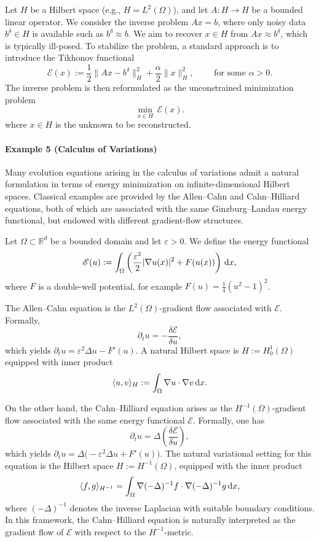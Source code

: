 \documentclass[12pt]{amsart}
\newcommand{\D}[1]{\mbox{\rm #1}}
\newcommand{\dd}{\D{d}}
\numberwithin{equation}{section}
\begin{document}
Let $H$ be a Hilbert space (e.g.,  $H = L^2(\Omega)$), and let $A : H \to H$ be a bounded linear operator. We consider the inverse problem $Ax = b$, where only noisy data $b^\delta \in H$ is available such as $b^\delta \approx b$. We aim to recover $x \in H$ from $Ax \approx b^\delta$, which is typically ill-posed. 
To stabilize the problem, a standard approach is to introduce the Tikhonov functional
\[
    \mathscr{E}(x) := \frac{1}{2}\|Ax - b^\delta\|_H^2 + \frac{\alpha}{2}\|x\|_H^2, \qquad \text{ for some } \alpha > 0.
\]
The inverse problem is then reformulated as the unconstrained minimization problem
\[
    \min_{x \in H}\, \mathscr{E}(x).
\]
where $x \in H$ is the unknown to be reconstructed.


\paragraph{\textbf{Example 5} (Calculus of Variations)} 

Many evolution equations arising in the calculus of variations admit a natural formulation in terms of energy minimization on infinite-dimensional Hilbert spaces. Classical examples are provided by the Allen--Cahn and Cahn--Hilliard equations, both of which are associated with the same Ginzburg--Landau energy functional, but endowed with different gradient-flow structures.

Let $\Omega \subset \mathbb{R}^d$ be a bounded domain and let $\varepsilon > 0$. We define the energy functional
\[
    \mathscr{E}(u) := \int_\Omega \left( \frac{\varepsilon^2}{2} |\nabla u(x)|^2 + F(u(x)) \right)\,\dd x,
\]
where $F$ is a double-well potential, for example $F(u)=\frac{1}{4}(u^2-1)^2$. 


The Allen--Cahn equation is the $L^2(\Omega)$-gradient flow associated with $\mathscr{E}$. Formally, 
\[
    \partial_t u = - \frac{\delta \mathscr{E}}{\delta u},
\]
which yields \; $\partial_t u = \varepsilon^2 \Delta u - F'(u)$. A natural Hilbert space is $H := H_0^1(\Omega)$ equipped with inner product
\[
    \langle u,v\rangle_H := \int_\Omega \nabla u \cdot \nabla v\,\dd x.
\]

On the other hand, the Cahn--Hilliard equation arises as the $H^{-1}(\Omega)$-gradient flow associated with the same energy functional $\mathscr{E}$. Formally, one has
\[
    \partial_t u = \Delta \left( \frac{\delta \mathscr{E}}{\delta u}\right),
\]
which yields \; $\partial_t u = \Delta\bigl(-\varepsilon^2 \Delta u + F'(u)\bigr)$. The natural variational setting for this equation is the Hilbert space $H := H^{-1}(\Omega)$, equipped with the inner product
\[
    \langle f,g\rangle_{H^{-1}} = \int_\Omega \nabla (-\Delta)^{-1}f \cdot \nabla (-\Delta)^{-1}g\,\dd x,
\]
where $(-\Delta)^{-1}$ denotes the inverse Laplacian with suitable boundary conditions. In this framework, the Cahn--Hilliard equation is naturally interpreted as the gradient flow of $\mathscr{E}$ with respect to the $H^{-1}$-metric.
\end{document}
